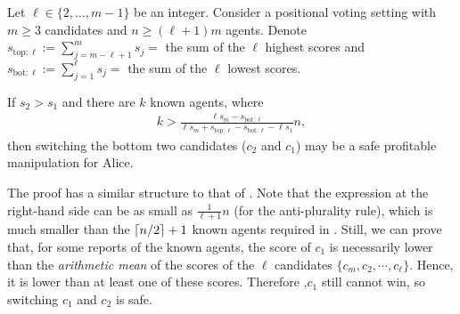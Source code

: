 \newcommand{\topLscores}{s_{\mathrm{top:}\ell}}
\newcommand{\botLscores}{s_{\mathrm{bot:}\ell}}
\begin{lemmarep}
\label{lem:z:s2>s1}
Let $\ell \in \{2,\ldots, m-1\}$ be an integer.
Consider a positional voting setting with $m\geq 3$ candidates and $n\geq (\ell+1)m$ agents.
Denote $\topLscores := \sum_{j=m-\ell+1}^m s_j = $  the sum of the $\ell$ highest scores and $\botLscores := \sum_{j=1}^{\ell}s_j = $ the sum of the $\ell$ lowest scores.

If $s_2 > s_1$ and there are $k$ known agents,
where 
\begin{align*}
k > \frac{\ell s_m - \botLscores}{\ell s_m + \topLscores - \botLscores - \ell s_1} n,
\end{align*}
then switching the bottom two candidates ($c_2$ and $c_1$) may be a safe profitable manipulation for Alice.
\end{lemmarep}
\begin{proofsketch}
The proof has a similar structure to that of .
Note that the expression at the right-hand side can be as small as $\displaystyle \frac{1}{\ell+1}n$ (for the anti-plurality rule), which is much smaller than the $\left\lceil n/2 \right\rceil+1$ known agents required in .
Still, we can prove that, for some reports of the known agents, the score of $c_1$ is necessarily lower than the \emph{arithmetic mean} of the scores of the $\ell$ candidates $\{c_m, c_2, \cdots, c_{\ell}\}$. Hence, it is lower than at least one of these scores. Therefore ,$c_1$ still cannot win, so switching $c_1$ and $c_2$ is safe.
\end{proofsketch}
